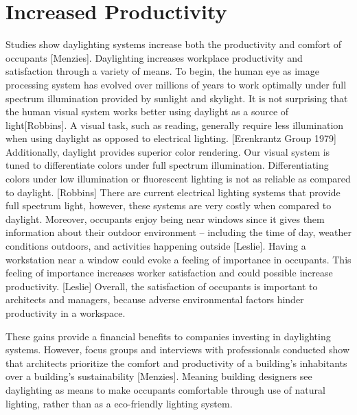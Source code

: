 \section{Increased Productivity}
Studies show daylighting systems increase both the productivity and comfort of occupants [Menzies].  Daylighting increases workplace productivity and satisfaction through a variety of means. To begin, the human eye as image processing system has evolved over millions of years to work optimally under full spectrum illumination provided by sunlight and skylight. It is not surprising that the human visual system works better using daylight as a source of light[Robbins]. A visual task, such as reading, generally require less illumination when using daylight as opposed to electrical lighting. [Erenkrantz Group 1979] Additionally, daylight provides superior color rendering. Our visual system is tuned to differentiate colors under full spectrum illumination. Differentiating colors under low illumination or fluorescent lighting is not as reliable as compared to daylight. [Robbins] There are current electrical lighting systems that provide full spectrum light, however, these systems are very costly when compared to daylight. Moreover, occupants enjoy being near windows since it gives them information about their outdoor environment -- including the time of day, weather conditions outdoors, and activities happening outside [Leslie].  Having a workstation near a window could evoke a feeling of importance in occupants. This feeling of importance increases worker satisfaction and could possible increase productivity. [Leslie] Overall, the satisfaction of occupants is important to architects and managers, because adverse environmental factors hinder productivity in a workspace. 

These gains provide a financial benefits to companies investing in daylighting systems. However, focus groups and interviews with professionals conducted show that architects prioritize the comfort and productivity of a building’s inhabitants over a building’s sustainability [Menzies]. Meaning building designers see daylighting as means to make occupants comfortable through use of natural lighting, rather than as a eco-friendly lighting system. 

